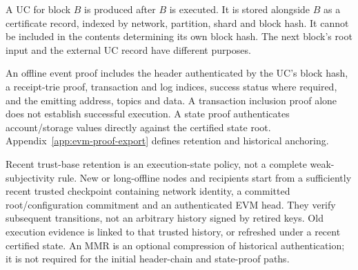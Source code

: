 A UC for block $B$ is produced after $B$ is executed. It is stored alongside $B$ as a certificate record, indexed by network, partition, shard and block hash. It cannot be included in the contents determining its own block hash. The next block's root input and the external UC record have different purposes.

An offline event proof includes the header authenticated by the UC's block hash, a receipt-trie proof, transaction and log indices, success status where required, and the emitting address, topics and data. A transaction inclusion proof alone does not establish successful execution. A state proof authenticates account/storage values directly against the certified state root. Appendix~\ref{app:evm-proof-export} defines retention and historical anchoring.

Recent trust-base retention is an execution-state policy, not a complete weak-subjectivity rule. New or long-offline nodes and recipients start from a sufficiently recent trusted checkpoint containing network identity, a committed root/configuration commitment and an authenticated EVM head. They verify subsequent transitions, not an arbitrary history signed by retired keys. Old execution evidence is linked to that trusted history, or refreshed under a recent certified state. An MMR is an optional compression of historical authentication; it is not required for the initial header-chain and state-proof paths.
